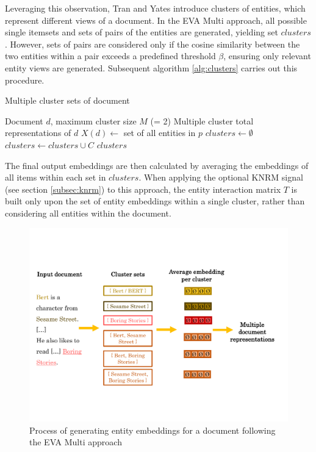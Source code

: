 Leveraging this observation, Tran and Yates introduce clusters of entities, which represent different views of a document. In the EVA Multi approach, all possible single itemsets and sets of pairs of the entities are generated, yielding set $clusters$. However, sets of pairs are considered only if the cosine similarity between the two entities within a pair exceeds a predefined threshold $\beta$, ensuring only relevant entity views are generated. Subsequent algorithm \ref{alg:clusters} carries out this procedure.


\begin{algorithm}[!htb]
    \footnotesize
    \caption{Multiple cluster sets of document}
    \label{alg:clusters}
    \begin{algorithmic}[1]
    \REQUIRE Document $d$, maximum cluster size $M$ (= 2)
    \ENSURE Multiple cluster total representations of $d$
    \STATE $X(d) \leftarrow$ set of all entities in $p$
    \STATE $clusters \leftarrow \emptyset$
            \STATE $clusters \leftarrow clusters \cup C$
        \ENDIF
    \ENDFOR
    \RETURN $clusters$
    \end{algorithmic}
\end{algorithm}

The final output embeddings are then calculated by averaging the embeddings of all items within each set in $clusters$. When applying the optional KNRM signal (see section \ref{subsec:knrm}) to this approach, the entity interaction matrix $T$ is built only upon the set of entity embeddings within a single cluster, rather than considering all entities within the document.

\begin{figure}[!htb]
    \centering
    \includegraphics[trim={0cm 3.4cm 0cm 3.8cm}, clip, width=\textwidth]{resources/eva_multi} 
    \caption{Process of generating entity embeddings for a document following the EVA Multi approach}
    \label{fig:eva_multi}
\end{figure}

